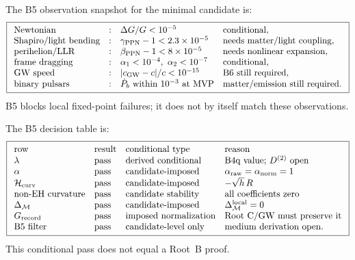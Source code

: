 \documentclass[11pt]{article}
\begin{document}
The B5 observation snapshot for the minimal candidate is:
\[
\boxed{
\begin{array}{llll}
\text{Newtonian} &:& \Delta G/G<10^{-5} & \text{conditional},\\
\text{Shapiro/light bending} &:& \gamma_{\rm PPN}-1<2.3\times10^{-5}
& \text{needs matter/light coupling},\\
\text{perihelion/LLR} &:& \beta_{\rm PPN}-1<8\times10^{-5}
& \text{needs nonlinear expansion},\\
\text{frame dragging} &:& \alpha_1<10^{-4},\ \alpha_2<10^{-7}
& \text{conditional},\\
\text{GW speed} &:& |c_{\rm GW}-c|/c<10^{-15}
& \text{B6 still required},\\
\text{binary pulsars} &:& \dot P_b\ \text{within }10^{-3}\ \text{at MVP}
& \text{matter/emission still required}.
\end{array}}
\]
B5 blocks local fixed-point failures; it does not by itself match these
observations.

The B5 decision table is:
\[
\boxed{
\begin{array}{llll}
\text{row} & \text{result} & \text{conditional type} & \text{reason}\\
\lambda & \text{pass} & \text{derived conditional} & \text{B4q value; }D^{(2)}\text{ open}\\
\alpha & \text{pass} & \text{candidate-imposed} & \alpha_{\rm raw}=\alpha_{\rm norm}=1\\
{\cal H}_{\rm curv} & \text{pass} & \text{candidate-imposed} & -\sqrt h\,R\\
\text{non-EH curvature} & \text{pass} & \text{candidate stability} & \text{all coefficients zero}\\
\Delta_{\mathcal M} & \text{pass} & \text{candidate-imposed} & \Delta_{\mathcal M}^{\rm local}=0\\
G_{\rm record} & \text{pass} & \text{imposed normalization} & \text{Root C/GW must preserve it}\\
\text{B5 filter} & \text{pass} & \text{candidate-level only} & \text{medium derivation open}.
\end{array}}
\]
This conditional pass does not equal a Root~B proof.
\end{document}
